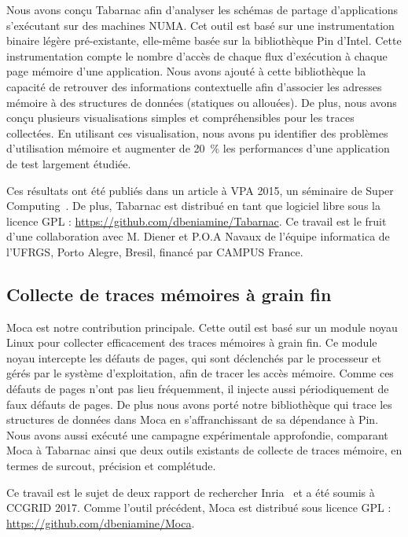Nous avons conçu \gls{Tabarnac} afin d'analyser les schémas de partage d'applications s'exécutant sur des machines NUMA.
Cet outil est basé sur une instrumentation binaire légère pré-existante, elle-même basée sur la bibliothèque \gls{Pin} d'\gls{Intel}.
Cette instrumentation compte le nombre d'accès de chaque flux d'exécution à chaque page mémoire d'une application.
Nous avons ajouté à cette bibliothèque la capacité de retrouver des informations contextuelle afin d'associer les adresses mémoire à des structures de données (statiques ou allouées).
De plus, nous avons conçu plusieurs visualisations simples et compréhensibles pour les traces collectées.
En utilisant ces visualisation, nous avons pu identifier des problèmes d'utilisation mémoire et augmenter de \SI{20}{\%} les performances d'une application de test largement étudiée.

Ces résultats ont été publiés dans un article à \gls{VPA} 2015, un séminaire de Super Computing~\cite{Beniamine15TABARNAC}.
De plus, \gls{Tabarnac} est distribué en tant que logiciel libre sous la licence \gls{GPL} : \url{https://github.com/dbeniamine/Tabarnac}.
Ce travail est le fruit d'une collaboration avec M. Diener et P.O.A Navaux de l'équipe informatica de l'\gls{UFRGS}, Porto Alegre, Bresil, financé par CAMPUS France.

\subsection*{Collecte de traces mémoires à grain fin}

\gls{Moca} est notre contribution principale.
Cette outil est basé sur un module noyau \gls{Linux} pour collecter efficacement des traces mémoires à grain fin.
Ce module noyau intercepte les défauts de pages, qui sont déclenchés par le processeur et gérés par le système d'exploitation, afin de tracer les accès mémoire.
Comme ces défauts de pages n'ont pas lieu fréquemment, il injecte aussi périodiquement de faux défauts de pages.
De plus nous avons porté notre bibliothèque qui trace les structures de données dans \gls{Moca} en s'affranchissant de sa dépendance à \gls{Pin}.
Nous avons aussi exécuté une campagne expérimentale approfondie, comparant \gls{Moca} à \gls{Tabarnac} ainsi que deux outils existants de collecte de traces mémoire, en termes de surcout, précision et complétude.

Ce travail est le sujet de deux rapport de rechercher Inria~\cite{Beniamine15Memory,Beniamine16Moca} et a été soumis à \gls{CCGRID} 2017.
Comme l'outil précédent, \gls{Moca} est distribué sous licence \gls{GPL} : \url{https://github.com/dbeniamine/Moca}.

